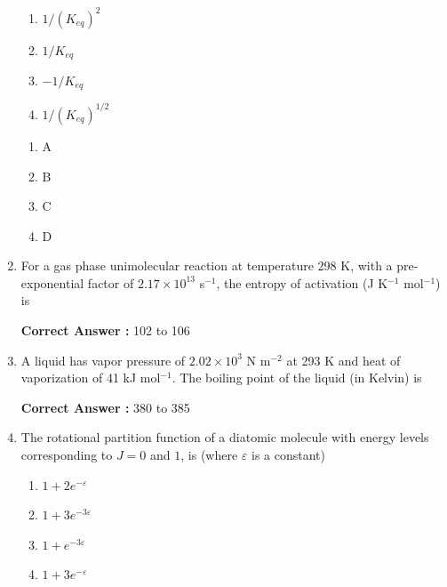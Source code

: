 \documentclass[journal,12pt,onecolumn]{exam}
\theoremstyle{remark}
\newcommand{\correct}{\textcolor{correctgreen}{\checkmark}}
\newcommand{\wrong}{\textcolor{wrongred}{\ding{55}}} %
\begin{document}
\begin{enumerate}
\begin{enumerate}
    \item $1/(K_{eq})^2$
    \item $1/K_{eq}$
    \item $-1/K_{eq}$
    \item $1/(K_{eq})^{1/2}$
\end{enumerate}

\hfill{}

\begin{multicols}{2}
\begin{enumerate}
    \item \wrong A
    \item \wrong B
    \item \wrong C
    \item \correct D
\end{enumerate}
\end{multicols}


\item 
For a gas phase unimolecular reaction at temperature 298 K, with a pre-exponential factor of $2.17 \times 10^{13}$ s$^{-1}$, the entropy of activation (J K$^{-1}$ mol$^{-1}$) is \underline{\hspace{3cm}}

\hfill{}


\textbf{Correct Answer :} \textcolor{green!60!black}{102 to 106}


\item 
A liquid has vapor pressure of $2.02 \times 10^3$ N m$^{-2}$ at 293 K and heat of vaporization of 41 kJ mol$^{-1}$. The boiling point of the liquid (in Kelvin) is \underline{\hspace{3cm}}

\hfill{}


\textbf{Correct Answer :} \textcolor{green!60!black}{380 to 385}







\item 
The rotational partition function of a diatomic molecule with energy levels corresponding to $J = 0$ and $1$, is (where $\varepsilon$ is a constant)

\begin{enumerate}
    \item $1 + 2e^{-\varepsilon}$
    \item $1 + 3e^{-3\varepsilon}$
    \item $1 + e^{-3\varepsilon}$
    \item $1 + 3e^{-\varepsilon}$
\end{enumerate}


\end{enumerate}
\end{document}
